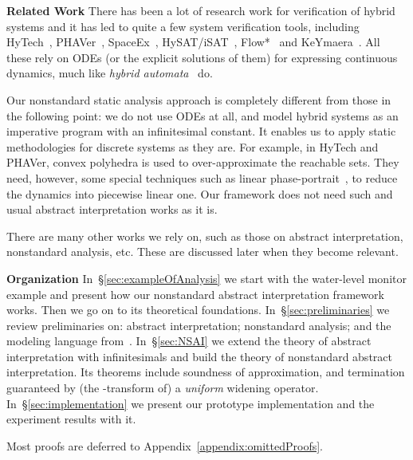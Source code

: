 \documentclass[envcountsect,orivec]{llncs} \pdfoutput=1
\theoremstyle{definition}
\begin{document}
\vspace*{.2em}
\noindent
\textbf{Related Work}
\quad
There has been a lot of research work for verification of hybrid systems
and it 
has led to quite a few system verification tools, including
 HyTech~\cite{Henzinger1997},
 PHAVer~\cite{Frehse05},
 SpaceEx~\cite{Frehse11},
 HySAT/iSAT~\cite{Franzle2007},
 Flow*~\cite{ChenAS13} and
 KeYmaera~\cite{PlatzerQ08}. All these rely on ODEs (or the explicit
 solutions of them) for expressing continuous dynamics, much like 
\emph{hybrid automata}~\cite{Alur1992} do.


Our nonstandard static analysis approach is completely different from
those in the following point: we do not use ODEs at all, and model
hybrid systems as an imperative program with an infinitesimal constant.
It enables us to apply static methodologies for discrete systems as they are.  For example, in HyTech and PHAVer, convex polyhedra is used to
over-approximate the reachable sets.  They need, however, some special
techniques such as linear phase-portrait~\cite{Henzinger95}, to reduce the dynamics into
piecewise linear one.  Our framework does not need such and usual
abstract interpretation works as it is.

There are many other works we rely on, such as
those on
abstract interpretation, nonstandard analysis, etc. These are discussed 
later when they become relevant. 




\vspace*{.2em}
\noindent
\textbf{Organization}
\quad
In~\S{}\ref{sec:exampleOfAnalysis} we start with the water-level monitor example and present how our nonstandard abstract interpretation framework works. Then we go on to its theoretical foundations.
In~\S{}\ref{sec:preliminaries} we review
preliminaries on: abstract
interpretation; nonstandard analysis; and the modeling language 
from~\cite{Suenaga2011}. 
In~\S{}\ref{sec:NSAI} we extend the theory of abstract
interpretation with infinitesimals and build the theory of nonstandard
abstract
interpretation. 
Its theorems include soundness of approximation, and
 termination guaranteed by (the -transform of) a \emph{uniform} widening
 operator. 
In~\S{}\ref{sec:implementation}
we present our prototype implementation and the experiment results with it.

Most proofs are deferred to Appendix~\ref{appendix:omittedProofs}.
\end{document}
